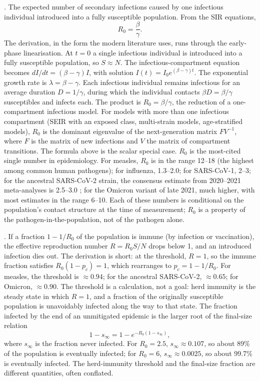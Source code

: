 . The expected number of
secondary infections caused by one infectious individual introduced
into a fully susceptible population. From the SIR equations,
\[
R_0 = \frac{\beta}{\gamma}.
\]
The derivation, in the form the modern literature uses, runs through
the early-phase linearisation. At $t = 0$ a single infectious
individual is introduced into a fully susceptible population, so
$S \approx N$. The infectious-compartment equation becomes
$dI/dt = (\beta - \gamma) I$, with solution $I(t) = I_0
e^{(\beta - \gamma)t}$. The exponential growth rate is
$\lambda = \beta - \gamma$. Each infectious individual remains
infectious for an average duration $D = 1/\gamma$, during which
the individual contacts $\beta D = \beta/\gamma$ susceptibles and
infects each. The product is $R_0 = \beta/\gamma$, the
 reduction of a one-compartment
infectious model. For models with more than one infectious
compartment (SEIR with an exposed class, multi-strain models,
age-stratified models), $R_0$ is the dominant eigenvalue of the
next-generation matrix $FV^{-1}$, where $F$ is the matrix of new
infections and $V$ the matrix of compartment transitions. The
formula above is the scalar special case.
$R_0$ is the most-cited single number in epidemiology. For measles,
$R_0$ is in the range 12--18 (the highest among common human
pathogens); for influenza, 1.3--2.0; for SARS-CoV-1, 2--3; for the
ancestral SARS-CoV-2 strain, the consensus estimate from 2020--2021
meta-analyses is 2.5--3.0 \cite[Tab.~1]{paper:v6c08-liu-covid-r0-2020}; for
the Omicron variant of late 2021, much higher, with most estimates in
the range 6--10. Each of these numbers is conditional on the
population's contact structure at the time of measurement;
$R_0$ is a property of the pathogen-in-the-population, not of the
pathogen alone.



. If a fraction $1 - 1/R_0$ of
the population is immune (by infection or vaccination), the
effective reproduction number $R = R_0 S/N$ drops below 1, and an
introduced infection dies out. The derivation is short: at the
threshold, $R = 1$, so the immune fraction satisfies $R_0 (1 - p_c)
= 1$, which rearranges to $p_c = 1 - 1/R_0$. For measles, the threshold is
$\approx 0.94$; for the ancestral SARS-CoV-2, $\approx 0.65$; for
Omicron, $\approx 0.90$. The threshold is a calculation, not a goal:
herd immunity is the steady state in which $R = 1$, and a fraction
of the originally susceptible population is unavoidably infected
along the way to that state. The fraction infected by the end of an
unmitigated epidemic is the larger root of the final-size relation
\[
1 - s_\infty = 1 - e^{-R_0 (1 - s_\infty)},
\]
where $s_\infty$ is the fraction never infected. For $R_0 = 2.5$,
$s_\infty \approx 0.107$, so about 89\% of the population is
eventually infected; for $R_0 = 6$, $s_\infty \approx 0.0025$, so
about 99.7\% is eventually infected. The herd-immunity threshold
and the final-size fraction are different quantities, often
conflated.

